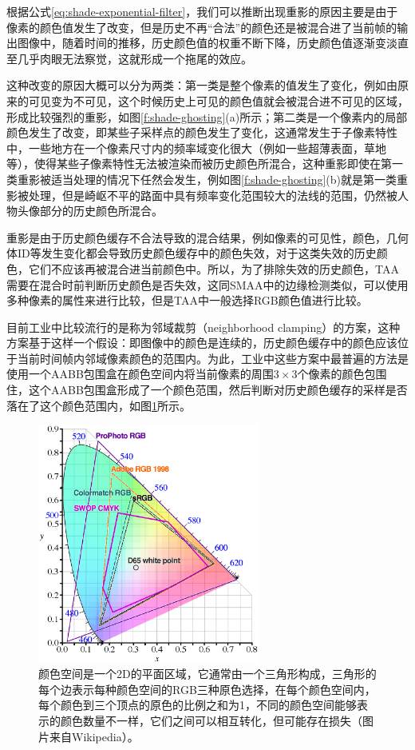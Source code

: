 根据公式\ref{eq:shade-exponential-filter}，我们可以推断出现重影的原因主要是由于像素的颜色值发生了改变，但是历史不再“合法”的颜色还是被混合进了当前帧的输出图像中，随着时间的推移，历史颜色值的权重不断下降，历史颜色值逐渐变淡直至几乎肉眼无法察觉，这就形成一个拖尾的效应。

这种改变的原因大概可以分为两类：第一类是整个像素的值发生了变化，例如由原来的可见变为不可见，这个时候历史上可见的颜色值就会被混合进不可见的区域，形成比较强烈的重影，如图\ref{f:shade-ghosting}(a)所示；第二类是一个像素内的局部颜色发生了改变，即某些子采样点的颜色发生了变化，这通常发生于子像素特性中，一些地方在一个像素尺寸内的频率域变化很大（例如一些超薄表面，草地等），使得某些子像素特性无法被渲染而被历史颜色所混合，这种重影即使在第一类重影被适当处理的情况下任然会发生，例如图\ref{f:shade-ghosting}(b)就是第一类重影被处理，但是崎岖不平的路面中具有频率变化范围较大的法线的范围，仍然被人物头像部分的历史颜色所混合。

重影是由于历史颜色缓存不合法导致的混合结果，例如像素的可见性，颜色，几何体ID等发生变化都会导致历史颜色缓存中的颜色失效，对于这类失效的历史颜色，它们不应该再被混合进当前颜色中。所以，为了排除失效的历史颜色，TAA需要在混合时前判断历史颜色是否失效，这同SMAA中的边缘检测类似，可以使用多种像素的属性来进行比较，但是TAA中一般选择RGB颜色值进行比较。

目前工业中\cite{a:AnExcursioninTemporalSupersampling,a:RealtimeglobalilluminationandreflectionsinDust514,a:TemporalAntialiasingInUncharted4,a:TemporalReprojectionAnti-AliasinginINSIDE}比较流行的是称为邻域裁剪（neighborhood clamping）的方案，这种方案基于这样一个假设：即图像中的颜色是连续的，历史颜色缓存中的颜色应该位于当前时间帧内邻域像素颜色的范围内。为此，工业中这些方案中最普遍的方法是使用一个AABB包围盒在颜色空间内将当前像素的周围$3\times 3$个像素的颜色包围住，这个AABB包围盒形成了一个颜色范围，然后判断对历史颜色缓存的采样是否落在了这个颜色范围内，如图\ref{f:shade-clamping}所示。

\begin{figure}
\sidecaption
	\includegraphics[width=0.65\textwidth]{figures/shade/color-space}
	\caption{颜色空间是一个2D的平面区域，它通常由一个三角形构成，三角形的每个边表示每种颜色空间的RGB三种原色选择，在每个颜色空间内，每个颜色到三个顶点的原色的比例之和为1，不同的颜色空间能够表示的颜色数量不一样，它们之间可以相互转化，但可能存在损失（图片来自Wikipedia）。}
	\label{f:shade-clamping}
\end{figure}

